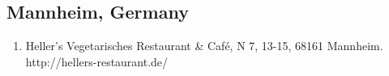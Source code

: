 \subsection{Mannheim, Germany}
\begin{enumerate}
	\item Heller's Vegetarisches Restaurant \& Café, N 7, 13-15, 68161 Mannheim. http://hellers-restaurant.de/
\end{enumerate}
